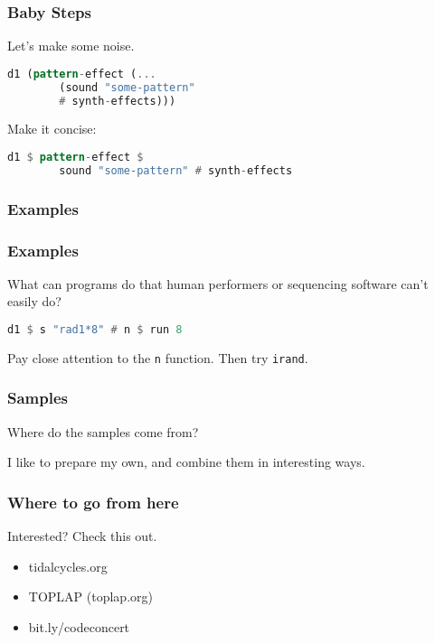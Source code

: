 \documentclass{beamer}
\begin{document}
	\begin{frame}[fragile]
		\frametitle{Baby Steps}
		Let's make some noise.
		
		\begin{lstlisting}[language=Haskell]
		d1 (pattern-effect (... 
		(sound "some-pattern" 
		# synth-effects)))
		\end{lstlisting}
		
		Make it concise:
		\begin{lstlisting}[language=Haskell]
		d1 $ pattern-effect $ 
		sound "some-pattern" # synth-effects
		\end{lstlisting}
	\end{frame}

	\begin{frame}
		\frametitle{Examples}
	\end{frame}

	\begin{frame}[fragile]
		\frametitle{Examples}
		What can programs do that human performers or sequencing software can't easily do?
		
		\begin{lstlisting}[language=Haskell]
		d1 $ s "rad1*8" # n $ run 8
		\end{lstlisting}
		
		Pay close attention to the \texttt{n} function. Then try \texttt{irand}.
	\end{frame}

	\begin{frame}
		\frametitle{Samples}
		Where do the samples come from?
		
		I like to prepare my own, and combine them in interesting ways.
	\end{frame}

	\begin{frame}
		\frametitle{Where to go from here}
		Interested? Check this out.
		\begin{itemize}
			\item tidalcycles.org 
			\item TOPLAP (toplap.org)
			\item bit.ly/codeconcert
		\end{itemize}
		
	\end{frame}
\end{document}

